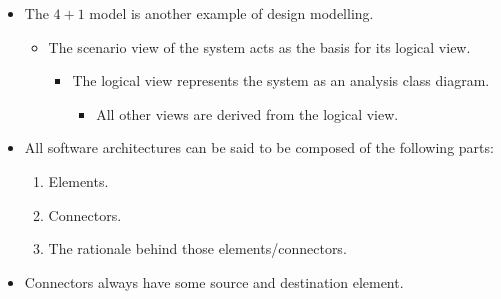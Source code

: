 \documentclass{article}
\begin{document}
\begin{itemize}
	\begin{enumerate}
		\item Boundary classes.
		\begin{itemize}
			\item Are interfaces between the system and its environment
			\item Keep the format of communication between the system and its environment as its secret.
		\end{itemize}
		\item Entity classes.
		\begin{itemize}
			\item Store data.
			\item Exchange data between classes.
			\item Keep an $n$-tuple (representing the data the entity class stores) as its secret.
		\end{itemize}
		\item Control classes.
		\begin{itemize}
			\item Coordinate interactions between other classes in response to a business event.
		\end{itemize}
	\end{enumerate}
	\item The $4 + 1$ model is another example of design modelling.
	\begin{itemize}
		\item The scenario view of the system acts as the basis for its logical view.
		\begin{itemize}
			\item The logical view represents the system as an analysis class diagram.
			\begin{itemize}
				\item All other views are derived from the logical view.
			\end{itemize}
		\end{itemize}
	\end{itemize}
	\item All software architectures can be said to be composed of the following parts:
	\begin{enumerate}
		\item Elements.
		\item Connectors.
		\item The rationale behind those elements/connectors.
	\end{enumerate}
	\item Connectors always have some source and destination element.

\end{itemize}
\end{document}
